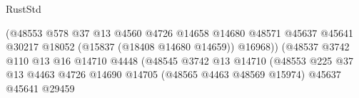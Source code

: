 \begin{lexlean}{RustStd}
\begin{coremodule}
{\begin{coremodule}
{{{{{{{{{{{{{{{{{{{{{{{{{{{{{{{{{{{{{{{{{{{{{{{{{{{{{{{{{{{{                                                            (@48553
                                                              @578
                                                              @37
                                                              @13
                                                              @4560
                                                              @4726
                                                              @14658
                                                              @14680
                                                              @48571
                                                              @45637
                                                              @45641
                                                              @30217
                                                              @18052
                                                              (@15837 (@18408 @14680 @14659))
                                                              @16968))
                                                          (@48537
                                                            @3742
                                                            @110
                                                            @13
                                                            @16
                                                            @14710
                                                            @4448
                                                            (@48545
                                                              @3742
                                                              @13
                                                              @14710
                                                              (@48553
                                                                @225
                                                                @37
                                                                @13
                                                                @4463
                                                                @4726
                                                                @14690
                                                                @14705
                                                                (@48565 @4463 @48569 @15974)
                                                                @45637
                                                                @45641
                                                                @29459
}}}}}}}}}}}}}}}}}}}}}}}}}}}}}}}}}}}}}}}}}}}}}}}}}}}}}}}}}}}}
\end{coremodule}}
\end{coremodule}
\end{lexlean}
